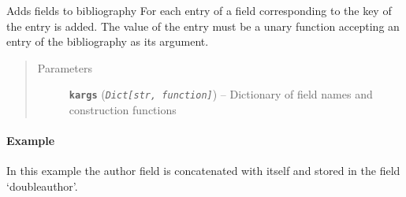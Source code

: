 \documentclass[letterpaper,10pt,english]{sphinxmanual}
\begin{document}
\begin{fulllineitems}
\begin{fulllineitems}
\end{fulllineitems}


\begin{fulllineitems}
\label{modules/pybibtools:listb.pybibtools.Bibliography.add_fields}
Adds fields to bibliography
For each entry of  a field corresponding to the key
of the entry is added. The value of the entry must be a
unary function accepting an entry of the bibliography as its
argument.
\begin{quote}\begin{description}
\item[{Parameters}] \leavevmode
\textbf{\texttt{kargs}} (\emph{\texttt{Dict{[}str, function{]}}}) -- Dictionary of field names and construction functions

\end{description}\end{quote}
\paragraph{Example}

In this example the author field is concatenated with itself
and stored in the field `doubleauthor'.


\end{fulllineitems}
\end{fulllineitems}
\end{document}
